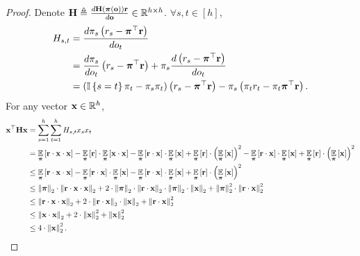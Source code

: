 \begin{proof}
    Denote ${\mathbf{H}} \triangleq \frac{d {\mathbf{H}}\left( {\boldsymbol{\pi}} \left({\mathbf{o}} \right) \right) {\mathbf{r}}}{d {\mathbf{o}} } \in {\mathbb{R}}^{h \times h}$. $\forall s, t \in [h]$,
\begin{equation*}
\begin{split}
    H_{s, t} &= \frac{d \pi_{s} \left( r_{s} - {\boldsymbol{\pi}}^\top {\mathbf{r}} \right) }{d o_{t}} \\
    &= \frac{d \pi_{s} }{d o_{t}} \left( r_{s} - {\boldsymbol{\pi}}^\top {\mathbf{r}} \right) + \pi_{s} \frac{d \left( r_{s} - {\boldsymbol{\pi}}^\top {\mathbf{r}} \right) }{d o_{t}} \\
    &=\left ( {\mathbb{I}}\left\{ s = t\right\} \pi_{t} -  \pi_{s } \pi_{t} \right) \left( r_{s} - {\boldsymbol{\pi}}^\top {\mathbf{r}} \right) - \pi_{s} \left( \pi_{t} r_{t} - \pi_{t} {\boldsymbol{\pi}}^\top {\mathbf{r}} \right).
\end{split}
\end{equation*}
For any vector ${\mathbf{x}} \in {\mathbb{R}}^h$, 
\begin{equation*}
\begin{split}
    {\mathbf{x}}^\top {\mathbf{H}} {\mathbf{x}} &= \sum\limits_{s=1}^{h}{ \sum\limits_{t=1}^{h}{ H_{s,t} x_s x_t} } \\
    &= \operatorname*{{\mathbb{E}}}\limits_{{\boldsymbol{\pi}}}\left[ {\mathbf{r}} \cdot {\mathbf{x}} \cdot {\mathbf{x}} \right] - \operatorname*{{\mathbb{E}}}\limits_{{\boldsymbol{\pi}}}\left[ {\mathbf{r}} \right] \cdot \operatorname*{{\mathbb{E}}}\limits_{{\boldsymbol{\pi}}}\left[ {\mathbf{x}} \cdot {\mathbf{x}} \right] - \operatorname*{{\mathbb{E}}}\limits_{{\boldsymbol{\pi}}}\left[ {\mathbf{r}} \cdot {\mathbf{x}} \right] \cdot \operatorname*{{\mathbb{E}}}\limits_{{\boldsymbol{\pi}}}\left[ {\mathbf{x}} \right] + \operatorname*{{\mathbb{E}}}\limits_{{\boldsymbol{\pi}}}\left[ {\mathbf{r}} \right] \cdot \left( \operatorname*{{\mathbb{E}}}\limits_{{\boldsymbol{\pi}}}\left[ {\mathbf{x}} \right] \right)^2  - \operatorname*{{\mathbb{E}}}\limits_{{\boldsymbol{\pi}}}\left[ {\mathbf{r}} \cdot {\mathbf{x}} \right] \cdot \operatorname*{{\mathbb{E}}}\limits_{{\boldsymbol{\pi}}}\left[ {\mathbf{x}} \right] + \operatorname*{{\mathbb{E}}}\limits_{{\boldsymbol{\pi}}}\left[ {\mathbf{r}} \right] \cdot \left( \operatorname*{{\mathbb{E}}}\limits_{{\boldsymbol{\pi}}}\left[ {\mathbf{x}} \right] \right)^2 \\
    &\le \operatorname*{{\mathbb{E}}}\limits_{{\boldsymbol{\pi}}}\left[ {\mathbf{r}} \cdot {\mathbf{x}} \cdot {\mathbf{x}} \right] - \operatorname*{{\mathbb{E}}}\limits_{{\boldsymbol{\pi}}}\left[ {\mathbf{r}} \cdot {\mathbf{x}} \right] \cdot \operatorname*{{\mathbb{E}}}\limits_{{\boldsymbol{\pi}}}\left[ {\mathbf{x}} \right] - \operatorname*{{\mathbb{E}}}\limits_{{\boldsymbol{\pi}}}\left[ {\mathbf{r}} \cdot {\mathbf{x}} \right] \cdot \operatorname*{{\mathbb{E}}}\limits_{{\boldsymbol{\pi}}}\left[ {\mathbf{x}} \right] + \operatorname*{{\mathbb{E}}}\limits_{{\boldsymbol{\pi}}}\left[ {\mathbf{r}} \right] \cdot \left( \operatorname*{{\mathbb{E}}}\limits_{{\boldsymbol{\pi}}}\left[ {\mathbf{x}} \right] \right)^2 \\
    &\le \left\| {\boldsymbol{\pi}} \right\|_2 \cdot \left\| {\mathbf{r}} \cdot {\mathbf{x}} \cdot {\mathbf{x}} \right\|_2 + 2 \cdot \left\| {\boldsymbol{\pi}} \right\|_2 \cdot \left\| {\mathbf{r}} \cdot {\mathbf{x}} \right\|_2 \cdot \left\| {\boldsymbol{\pi}} \right\|_2 \cdot \left\| {\mathbf{x}} \right\|_2 + \left\| {\boldsymbol{\pi}} \right\|_2^2 \cdot \left\| {\mathbf{r}} \cdot {\mathbf{x}} \right\|_2^2 \\
    &\le \left\| {\mathbf{r}} \cdot {\mathbf{x}} \cdot {\mathbf{x}} \right\|_2 + 2 \cdot \left\| {\mathbf{r}} \cdot {\mathbf{x}} \right\|_2 \cdot \left\| {\mathbf{x}} \right\|_2 + \left\| {\mathbf{r}} \cdot {\mathbf{x}} \right\|_2^2 \\
    &\le \left\| {\mathbf{x}} \cdot {\mathbf{x}} \right\|_2 + 2 \cdot \left\| {\mathbf{x}} \right\|_2^2 + \left\| {\mathbf{x}} \right\|_2^2 \\
    &\le 4 \cdot \left\| {\mathbf{x}} \right\|_2^2. \qedhere
\end{split}
\end{equation*}
\end{proof}

